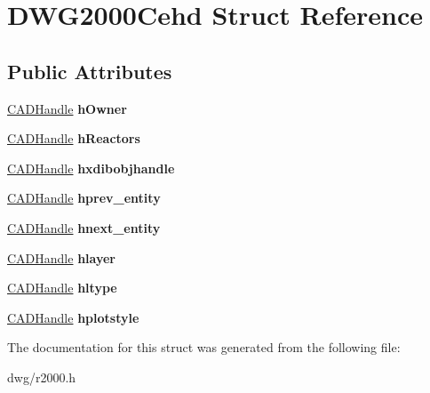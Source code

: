 \hypertarget{struct_d_w_g2000_cehd}{}\section{D\+W\+G2000\+Cehd Struct Reference}
\label{struct_d_w_g2000_cehd}
\subsection*{Public Attributes}
\begin{DoxyCompactItemize}
\item 
\hyperlink{class_c_a_d_handle}{C\+A\+D\+Handle} {\bfseries h\+Owner}\hypertarget{struct_d_w_g2000_cehd_a8254855dae73718dc5d910607c011093}{}\label{struct_d_w_g2000_cehd_a8254855dae73718dc5d910607c011093}

\item 
\hyperlink{class_c_a_d_handle}{C\+A\+D\+Handle} {\bfseries h\+Reactors}\hypertarget{struct_d_w_g2000_cehd_ae1d3fc44ce57cf25519199645f852e26}{}\label{struct_d_w_g2000_cehd_ae1d3fc44ce57cf25519199645f852e26}

\item 
\hyperlink{class_c_a_d_handle}{C\+A\+D\+Handle} {\bfseries hxdibobjhandle}\hypertarget{struct_d_w_g2000_cehd_a8d77b77d32150bd8098293774089bba1}{}\label{struct_d_w_g2000_cehd_a8d77b77d32150bd8098293774089bba1}

\item 
\hyperlink{class_c_a_d_handle}{C\+A\+D\+Handle} {\bfseries hprev\+\_\+entity}\hypertarget{struct_d_w_g2000_cehd_a70f008a79ff42fab1e1124199ae3c66d}{}\label{struct_d_w_g2000_cehd_a70f008a79ff42fab1e1124199ae3c66d}

\item 
\hyperlink{class_c_a_d_handle}{C\+A\+D\+Handle} {\bfseries hnext\+\_\+entity}\hypertarget{struct_d_w_g2000_cehd_a24682ae7f283409199fb0ce5bf7b9135}{}\label{struct_d_w_g2000_cehd_a24682ae7f283409199fb0ce5bf7b9135}

\item 
\hyperlink{class_c_a_d_handle}{C\+A\+D\+Handle} {\bfseries hlayer}\hypertarget{struct_d_w_g2000_cehd_afe2fd190046ac4fcad3de51d1c947809}{}\label{struct_d_w_g2000_cehd_afe2fd190046ac4fcad3de51d1c947809}

\item 
\hyperlink{class_c_a_d_handle}{C\+A\+D\+Handle} {\bfseries hltype}\hypertarget{struct_d_w_g2000_cehd_a6743e6f714e8200dae477caaa1fdfe34}{}\label{struct_d_w_g2000_cehd_a6743e6f714e8200dae477caaa1fdfe34}

\item 
\hyperlink{class_c_a_d_handle}{C\+A\+D\+Handle} {\bfseries hplotstyle}\hypertarget{struct_d_w_g2000_cehd_ab112bf0e96e34af7ce03713d0bdd7cf5}{}\label{struct_d_w_g2000_cehd_ab112bf0e96e34af7ce03713d0bdd7cf5}

\end{DoxyCompactItemize}


The documentation for this struct was generated from the following file\+:\begin{DoxyCompactItemize}
\item 
dwg/r2000.\+h\end{DoxyCompactItemize}

